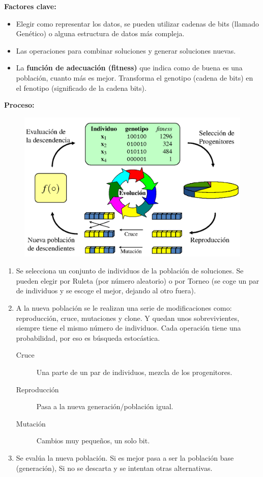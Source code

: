 \documentclass[12pt, twoside, openright]{report} %
\begin{document}
\textbf{Factores clave:}
\begin{itemize}
  \item Elegir como representar los datos, se pueden utilizar cadenas de bits (llamado Genético) o alguna estructura de datos más compleja.
  \item Las operaciones para combinar soluciones y generar soluciones nuevas.
  \item La \textbf{función de adecuación (fitness)} que indica como de buena es una población, cuanto más es mejor. Transforma el genotipo (cadena de bits) en el fenotipo (significado de la cadena bits).
\end{itemize}
\pagebreak
\textbf{Proceso:}
\begin{figure}[H]
	{\includegraphics[scale=.3]{2021-03-19 11_42_34-otras-tecnicas.pdf - Foxit Reader.png}}
\end{figure}
\begin{enumerate}
  \item Se selecciona un conjunto de individuos de la población de soluciones. Se pueden elegir por Ruleta (por número aleatorio) o por Torneo (se coge un par de individuos y se escoge el mejor, dejando al otro fuera).
  \item A la nueva población se le realizan una serie de modificaciones como: reproducción, cruce, mutaciones y clone. Y quedan unos sobrevivientes, siempre tiene el mismo número de individuos.
  Cada operación tiene una probabilidad, por eso es búsqueda estocástica.
  \begin{description}
    \item[Cruce] Una parte de un par de individuos, mezcla de los progenitores.
    \item[Reproducción] Pasa a la nueva generación/población igual.
    \item[Mutación] Cambios muy pequeños, un solo bit.
  \end{description}
  \item Se evalúa la nueva población. Si es mejor pasa a ser la población base (generación), Si no se descarta y se intentan otras alternativas.
\end{enumerate}
\end{document}
